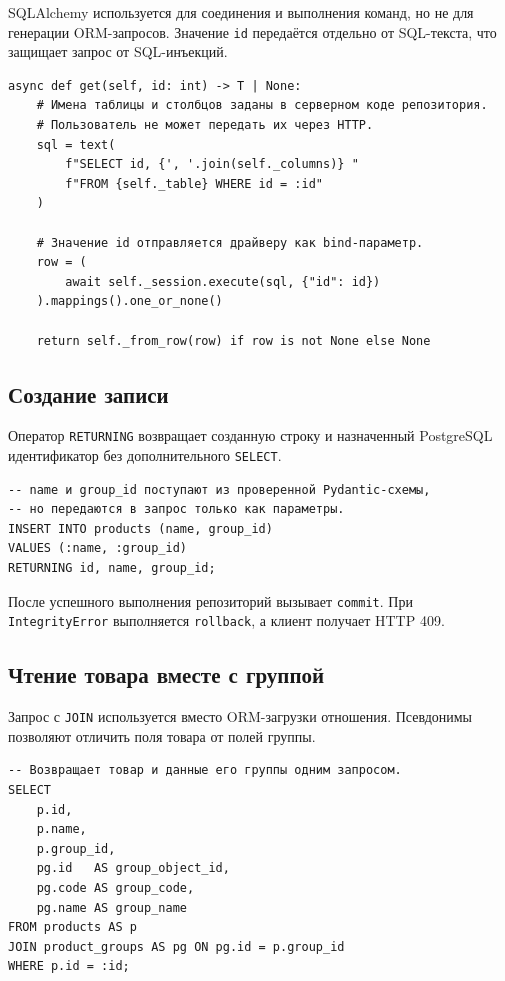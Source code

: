 \documentclass[14pt,a4paper]{extarticle}
\begin{document}
SQLAlchemy используется для соединения и выполнения команд, но не для
генерации ORM-запросов. Значение \texttt{id} передаётся отдельно от SQL-текста,
что защищает запрос от SQL-инъекций.

\begin{verbatim}
async def get(self, id: int) -> T | None:
    # Имена таблицы и столбцов заданы в серверном коде репозитория.
    # Пользователь не может передать их через HTTP.
    sql = text(
        f"SELECT id, {', '.join(self._columns)} "
        f"FROM {self._table} WHERE id = :id"
    )

    # Значение id отправляется драйверу как bind-параметр.
    row = (
        await self._session.execute(sql, {"id": id})
    ).mappings().one_or_none()

    return self._from_row(row) if row is not None else None
\end{verbatim}

\subsection{Создание записи}

Оператор \texttt{RETURNING} возвращает созданную строку и назначенный
PostgreSQL идентификатор без дополнительного \texttt{SELECT}.

\begin{verbatim}
-- name и group_id поступают из проверенной Pydantic-схемы,
-- но передаются в запрос только как параметры.
INSERT INTO products (name, group_id)
VALUES (:name, :group_id)
RETURNING id, name, group_id;
\end{verbatim}

После успешного выполнения репозиторий вызывает \texttt{commit}. При
\texttt{IntegrityError} выполняется \texttt{rollback}, а клиент получает HTTP
409.

\subsection{Чтение товара вместе с группой}

Запрос с \texttt{JOIN} используется вместо ORM-загрузки отношения. Псевдонимы
позволяют отличить поля товара от полей группы.

\begin{verbatim}
-- Возвращает товар и данные его группы одним запросом.
SELECT
    p.id,
    p.name,
    p.group_id,
    pg.id   AS group_object_id,
    pg.code AS group_code,
    pg.name AS group_name
FROM products AS p
JOIN product_groups AS pg ON pg.id = p.group_id
WHERE p.id = :id;
\end{verbatim}
\end{document}
